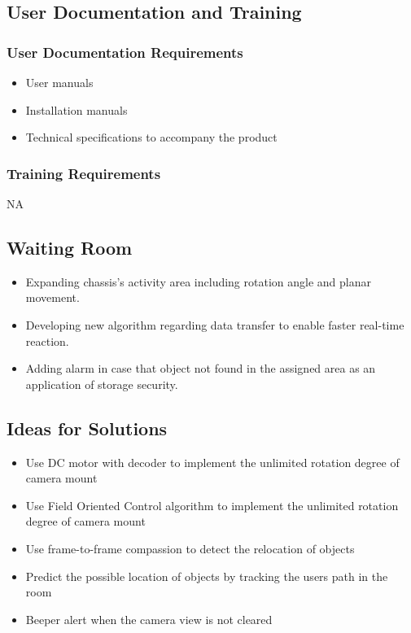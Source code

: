 \documentclass[12pt]{article}
\begin{document}
\subsection{User Documentation and Training}
    \subsubsection{User Documentation Requirements}
    \begin{itemize}
        \item User manuals
        \item Installation manuals
        \item Technical specifications to accompany the product
    \end{itemize}
    
    \subsubsection{Training Requirements}
    NA
\subsection{Waiting Room}
\begin{itemize}
    \item Expanding chassis's activity area including rotation angle and planar movement.
    \item Developing new algorithm regarding data transfer to enable faster real-time reaction.
    \item Adding alarm in case that object not found in the assigned area as an application of storage security.
\end{itemize}
\subsection{Ideas for Solutions}
\begin{itemize}
    \item Use DC motor with decoder to implement the unlimited rotation degree of camera mount
    \item Use Field Oriented Control algorithm to implement the unlimited rotation degree of camera mount
    \item Use frame-to-frame compassion to detect the relocation of objects
    \item Predict the possible location of objects by tracking the users path in the room
    \item Beeper alert when the camera view is not cleared
\end{itemize}
\end{document}
